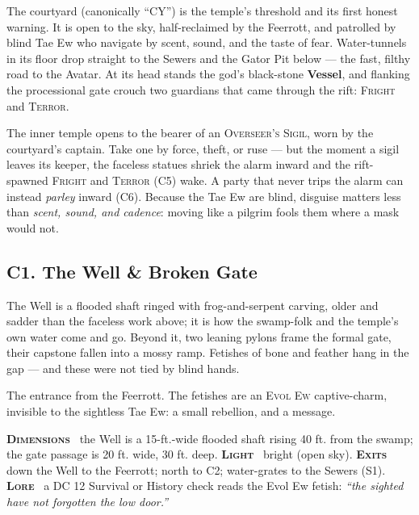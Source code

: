 \documentclass[10pt,twoside]{article}
\newcommand{\tech}[1]{\textbf{\scshape\textcolor{stone}{#1}}\ }
\newcommand{\eqname}[1]{\textsc{#1}}
\begin{document}
The courtyard (canonically ``CY'') is the temple's threshold and its first honest
warning. It is open to the sky, half-reclaimed by the Feerrott, and patrolled by
blind Tae Ew who navigate by scent, sound, and the taste of fear. Water-tunnels in
its floor drop straight to the Sewers and the Gator Pit below --- the fast, filthy
road to the Avatar. At its head stands the god's black-stone \textbf{Vessel},
and flanking the processional gate crouch two guardians that came through the rift:
\eqname{Fright} and \eqname{Terror}.

\begin{dmnote}
The inner temple opens to the bearer of an \eqname{Overseer's Sigil}, worn by the
courtyard's captain. Take one by force, theft, or ruse --- but the moment a sigil
leaves its keeper, the faceless statues shriek the alarm inward and the rift-spawned
\eqname{Fright} and \eqname{Terror} (C5) wake. A party that never trips the alarm can
instead \emph{parley} inward (C6). Because the Tae Ew are blind, disguise matters
less than \emph{scent, sound, and cadence}: moving like a pilgrim fools them where a
mask would not.
\end{dmnote}

\subsection{C1. The Well \& Broken Gate}
\begin{readaloud}
The Well is a flooded shaft ringed with frog-and-serpent carving, older and sadder
than the faceless work above; it is how the swamp-folk and the temple's own water
come and go. Beyond it, two leaning pylons frame the formal gate, their capstone
fallen into a mossy ramp. Fetishes of bone and feather hang in the gap --- and these
were not tied by blind hands.
\end{readaloud}
The entrance from the Feerrott. The fetishes are an \eqname{Evol Ew} captive-charm,
invisible to the sightless Tae Ew: a small rebellion, and a message.

\begin{techbox}
\tech{Dimensions} the Well is a 15-ft.-wide flooded shaft rising 40 ft. from the
swamp; the gate passage is 20 ft. wide, 30 ft. deep. \tech{Light} bright (open sky).
\tech{Exits} down the Well to the Feerrott; north to C2; water-grates to the Sewers
(S1). \tech{Lore} a DC 12 Survival or History check reads the Evol Ew fetish:
\emph{``the sighted have not forgotten the low door.''}
\end{techbox}
\end{document}
